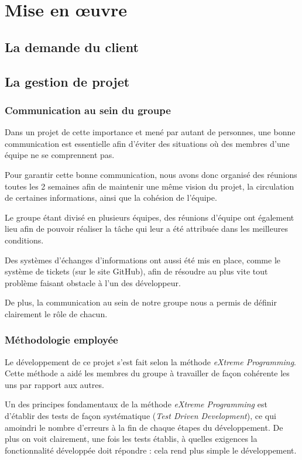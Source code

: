 \chapter{Mise en œuvre}
\section{La demande du client}

\section{La gestion de projet}

\subsection{Communication au sein du groupe}

  Dans un projet de cette importance et mené par autant de personnes, une
  bonne communication est essentielle afin d'éviter des situations où des
  membres d'une équipe ne se comprennent pas.

  Pour garantir cette bonne communication, nous avons donc organisé des
  réunions toutes les 2 semaines afin de maintenir une même vision du projet,
  la circulation de certaines informations, ainsi que la cohésion de l'équipe.

  Le groupe étant divisé en plusieurs équipes, des réunions d'équipe ont
  également lieu afin de pouvoir réaliser la tâche qui leur a été attribuée
  dans les meilleures conditions.

  Des systèmes d'échanges d'informations ont aussi été mis en place, comme le
  système de tickets (sur le site GitHub), afin de résoudre au plus vite tout
  problème faisant obstacle à l'un des développeur.

  De plus, la communication au sein de notre groupe nous a permis de définir
  clairement le rôle de chacun.


\subsection{Méthodologie employée}

  Le développement de ce projet s'est fait selon la méthode \emph{eXtreme
  Programming}. Cette méthode a aidé les membres du groupe à travailler de
  façon cohérente les uns par rapport aux autres.

  Un des principes fondamentaux de la méthode \emph{eXtreme Programming} est
  d'établir des tests de façon systématique (\emph{Test Driven Development}),
  ce qui amoindri le nombre d'erreurs à la fin de chaque étapes du
  développement. De plus on voit clairement, une fois les tests établis, à
  quelles exigences la fonctionnalité développée doit répondre : cela rend
  plus simple le développement.

